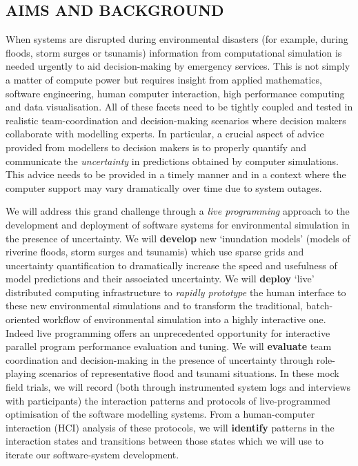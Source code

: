 \subsection*{AIMS AND BACKGROUND}

When systems are disrupted during environmental disasters (for example,
during floods, storm surges or tsunamis) information from
computational simulation is needed urgently to aid decision-making by
emergency services. This is not simply a matter of compute power but
requires insight from applied mathematics, software
engineering, human computer interaction, high performance computing
and data visualisation. All of these facets need to be tightly coupled
and tested in realistic team-coordination and decision-making
scenarios where decision makers collaborate with modelling experts. In
particular, a crucial aspect of advice provided from modellers to
decision makers is to properly quantify and communicate the
\emph{uncertainty} in predictions obtained by computer simulations.
This advice needs to be provided in a timely manner and in a context
where the computer support may vary dramatically over time due to
system outages.

We will address this grand challenge through a \emph{live programming}
approach to the development and deployment of software systems for
environmental simulation in the presence of uncertainty. We will
\textbf{develop} new `inundation models' (models of riverine floods,
storm surges and tsunamis) which use sparse grids and uncertainty
quantification to dramatically increase the speed and usefulness of
model predictions and their associated uncertainty. We will
\textbf{deploy} `live' distributed computing infrastructure to
\emph{rapidly prototype} the human interface to these new
environmental simulations and to transform the traditional,
batch-oriented workflow of environmental simulation into a highly
interactive one. Indeed live programming offers an unprecedented opportunity
for interactive parallel program performance evaluation and tuning.
We will \textbf{evaluate} team coordination and
decision-making in the presence of uncertainty through role-playing
scenarios of representative flood and tsunami situations. In these mock
field trials, we will record (both through instrumented system logs
and interviews with participants) the interaction patterns and
protocols of live-programmed optimisation of the software modelling
systems. From a human-computer interaction (HCI) analysis of these
protocols, we will \textbf{identify} patterns in the interaction
states and transitions between those states which we will use to
iterate our software-system development.

